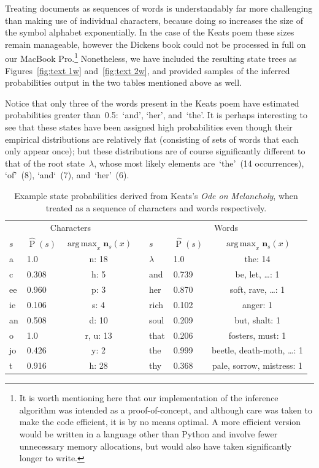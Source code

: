 \documentclass[12pt,a4paper]{article}
\newcommand\ub[1]{\symbf{#1}}                 %
\DeclareMathOperator\Pb{P}                    %
\DeclareMathOperator*{\argmax}{arg\,max}
\begin{document}
Treating documents as sequences of words is understandably far more challenging
than making use of individual characters, because doing so increases the size of
the symbol alphabet exponentially. In the case of the Keats poem these sizes
remain manageable, however the Dickens book could not be processed in full on
our MacBook Pro.\footnote{It is worth mentioning here that our implementation of
the inference algorithm was intended as a proof-of-concept, and although care
was taken to make the code efficient, it is by no means optimal. A more
efficient version would be written in a language other than Python and involve
fewer unnecessary memory allocations, but would also have taken significantly
longer to write.} Nonetheless, we have included the resulting state trees as
Figures~\ref{fig:text 1w} and~\ref{fig:text 2w}, and provided samples of the
inferred probabilities output in the two tables mentioned above as well.

Notice that only three of the words present in the Keats poem have estimated
probabilities greater than~0.5:~`and', `her', and~`the'. It is perhaps
interesting to see that these states have been assigned high probabilities even
though their empirical distributions are relatively flat (consisting of sets of
words that each only appear once); but these distributions are of course
significantly different to that of the root state~\(\lambda\), whose most likely
elements are~`the'~(14 occurrences), `of'~(8), `and`~(7), and~`her'~(6).
%


\begin{table}[htbp]
\centering
\begin{tabular}{llccllc}
  \toprule
  \multicolumn{3}{c}{Characters} && \multicolumn{3}{c}{Words} \\
  \cmidrule{1-3} \cmidrule{5-7}
  \(s\) & \(\hat{\Pb}(s)\) & \(\argmax_x \ub{n}_s(x)\) &&
  \(s\) & \(\hat{\Pb}(s)\) & \(\argmax_x \ub{n}_s(x)\) \\
  \midrule
  a  & 1.0   & n: 18    && \(\lambda\) & 1.0   & the: 14                      \\
  c  & 0.308 & h: 5     && and         & 0.739 & be, let, \dots: 1            \\
  ee & 0.960 & p: 3     && her         & 0.870 & soft, rave, \dots: 1         \\
  ie & 0.106 & s: 4     && rich        & 0.102 & anger: 1                     \\
  an & 0.508 & d: 10    && soul        & 0.209 & but, shalt: 1                \\
  o  & 1.0   & r, u: 13 && that        & 0.206 & fosters, must: 1             \\
  jo & 0.426 & y: 2     && the         & 0.999 & beetle, death-moth, \dots: 1 \\
  t  & 0.916 & h: 28    && thy         & 0.368 & pale, sorrow, mistress: 1    \\
  \bottomrule
\end{tabular}
\caption{Example state probabilities derived from Keats's \textit{Ode on
  Melancholy}, when treated as a sequence of characters and words respectively.}
\label{tab:text 1}
\end{table}
\end{document}
